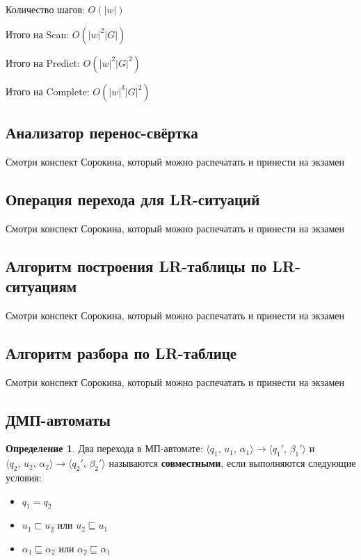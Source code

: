 \documentclass[a4paper,12pt]{article}
\theoremstyle{plain}
\theoremstyle{definition}
\newtheorem{definition}{Определение}[subsection]
\theoremstyle{remark}
\begin{document}
Количество шагов: $O(\vert w\vert)$

Итого на Scan: $O(\vert w\vert^2\vert G\vert)$

Итого на Predict: $O(\vert w\vert^2\vert G\vert^2)$

Итого на Complete: $O(\vert w\vert^3\vert G\vert^2)$

\subsection{Анализатор перенос-свёртка}
Смотри конспект Сорокина, который можно распечатать и принести на экзамен

\subsection{Операция перехода для LR-ситуаций}
Смотри конспект Сорокина, который можно распечатать и принести на экзамен

\subsection{Алгоритм построения LR-таблицы по LR-ситуациям}
Смотри конспект Сорокина, который можно распечатать и принести на экзамен

\subsection{Алгоритм разбора по LR-таблице}
Смотри конспект Сорокина, который можно распечатать и принести на экзамен

\subsection{ДМП-автоматы}
\begin{definition}
	Два перехода в МП-автомате: $\langle q_1,\, u_1,\, \alpha_1\rangle \to \langle q_1',\, \beta_1'\rangle$ и $\langle q_2,\, u_2,\, \alpha_2\rangle \to \langle q_2',\, \beta_2'\rangle$ называются \textbf{совместными}, если выполняются следующие условия:
	\begin{itemize}
		\item $q_1 = q_2$
		\item $u_1 \sqsubset u_2$ или $u_2 \sqsubseteq u_1$
		\item $\alpha_1 \sqsubseteq \alpha_2$ или $\alpha_2 \sqsubseteq \alpha_1$
	\end{itemize}
\end{definition}
\end{document}
